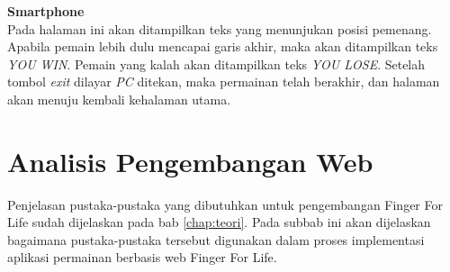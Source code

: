 \begin{enumerate}
	\textbf{Smartphone} \\
	Pada halaman ini akan ditampilkan teks yang menunjukan posisi pemenang. Apabila pemain lebih dulu mencapai garis akhir, maka akan ditampilkan teks \textit{YOU WIN}. Pemain yang kalah akan ditampilkan teks \textit{YOU LOSE}. Setelah tombol \textit{exit} dilayar \textit{PC} ditekan, maka permainan telah berakhir, dan halaman akan menuju kembali kehalaman utama.
	
\end{enumerate}

\section{Analisis Pengembangan Web}
\label{sec:pengembangan}

Penjelasan pustaka-pustaka yang dibutuhkan untuk pengembangan Finger For Life sudah dijelaskan pada bab \ref{chap:teori}. Pada subbab ini akan dijelaskan bagaimana pustaka-pustaka tersebut digunakan dalam proses implementasi aplikasi permainan berbasis web Finger For Life.

